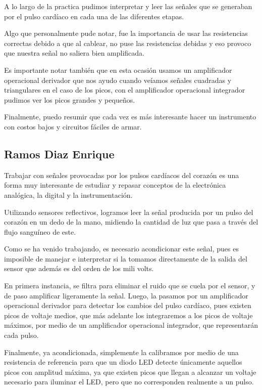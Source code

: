\documentclass[12pt]{article}
\begin{document}
            A lo largo de la practica pudimos interpretar y leer las señales que se generaban por el pulso cardíaco  en cada una de las diferentes etapas.
            
            Algo que personalmente pude notar, fue la importancia de usar las resistencias correctas debido a que al cablear, no puse las resistencias debidas y eso provoco que nuestra señal no saliera bien amplificada.
            
            Es importante notar también que en esta ocasión usamos un amplificador operacional derivador que nos ayudo cuando veíamos señales cuadradas y triangulares en el caso de los picos, con el amplificador operacional integrador pudimos ver los picos grandes y pequeños.
            
            Finalmente, puedo resumir que cada vez es más interesante hacer un instrumento con costos bajos y circuitos fáciles de armar.
            
        \subsection{Ramos Diaz Enrique}
        Trabajar con señales provocadas por los pulsos cardíacos del corazón es una forma muy interesante de estudiar y repasar conceptos de la electrónica analógica, la digital y la instrumentación.
        
        Utilizando sensores reflectivos, logramos leer la señal producida por un pulso del corazón en un dedo de la mano, midiendo la cantidad de luz que pasa a través del flujo sanguíneo de este.
        
        Como se ha venido trabajando, es necesario acondicionar este señal, pues es imposible de manejar e interpretar si la tomamos directamente de la salida del sensor que además es del orden de los mili volts.
        
        En primera instancia, se filtra para eliminar el ruido que se cuela por el sensor, y de paso amplificar ligeramente la señal. Luego, la pasamos por un amplificador operacional derivador para detectar los cambios del pulso cardíaco, pues existen picos de voltaje medios, que más adelante los integraremos a los picos de voltaje máximos, por medio de un amplificador operacional integrador, que representarán cada pulso.
        
        Finalmente, ya acondicionada, simplemente la calibramos por medio de una resistencia de referencia para que un diodo LED detecte únicamente aquellos picos con amplitud máxima, ya que existen picos que llegan a alcanzar un voltaje necesario para iluminar el LED, pero que no corresponden realmente a un pulso.
        
\end{document}

